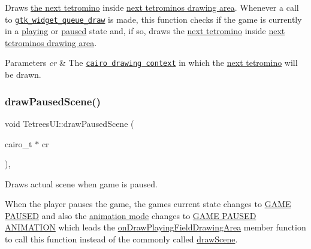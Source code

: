 Draws \hyperlink{classTetreesUI_a6296ce8f3cde853cec110718c4b88540}{the next tetromino} inside \hyperlink{TetreesUI_8cpp_aac997784ac88b494498d6e08d6fe62d5}{next tetromino\textquotesingle{}s drawing area}. Whenever a call to \href{https://developer.gnome.org/gtk3/stable/GtkWidget.html#gtk-widget-queue-draw}{\tt gtk\+\_\+widget\+\_\+queue\+\_\+draw} is made, this function checks if the game is currently in a \hyperlink{TetreesDefs_8hpp_aebae08b2e3a36f1452b33acaf1eaab40ab8ee64fcce8c3b17312b20c78fc9695a}{playing} or \hyperlink{TetreesDefs_8hpp_aebae08b2e3a36f1452b33acaf1eaab40ae6a757f0eb2e39168756440ac804ffa7}{paused} state and, if so, draws the \hyperlink{classTetreesUI_a6296ce8f3cde853cec110718c4b88540}{next tetromino} inside \hyperlink{TetreesUI_8cpp_aac997784ac88b494498d6e08d6fe62d5}{next tetromino\textquotesingle{}s drawing area}. 
\begin{DoxyParams}{Parameters}
{\em cr} & The \href{https://www.cairographics.org/manual/cairo-cairo-t.html}{\tt cairo drawing context} in which the \hyperlink{classTetreesUI_a6296ce8f3cde853cec110718c4b88540}{next tetromino} will be drawn. \\
\hline
\end{DoxyParams}
\mbox{\label{classTetreesUI_a7d39f8caa75f5e755e3cebb0e05bb779}} 
\subsubsection{\texorpdfstring{draw\+Paused\+Scene()}{drawPausedScene()}}
{\footnotesize\ttfamily void Tetrees\+U\+I\+::draw\+Paused\+Scene (\begin{DoxyParamCaption}\item[{cairo\+\_\+t $\ast$}]{cr }\end{DoxyParamCaption})\hspace{0.3cm}{\ttfamily [static]}, {\ttfamily [private]}}



Draws actual scene when game is paused. 

When the player pauses the game, the game\textquotesingle{}s current state changes to \hyperlink{TetreesDefs_8hpp_aebae08b2e3a36f1452b33acaf1eaab40ae6a757f0eb2e39168756440ac804ffa7}{G\+A\+ME P\+A\+U\+S\+ED} and also the \hyperlink{classTetreesUI_af3bd9b55da30d2b324c2dfe2d740d8a2}{animation mode} changes to \hyperlink{TetreesDefs_8hpp_a10487f3bfa31fd7b7b8c20f403f8c947abd2f3ba6deac9f6ca85c0c6247ab445c}{G\+A\+ME P\+A\+U\+S\+ED A\+N\+I\+M\+A\+T\+I\+ON} which leads the \hyperlink{classTetreesUI_a829fc73fdc1f45fb567168f2c37ab012}{on\+Draw\+Playing\+Field\+Drawing\+Area} member function to call this function instead of the commonly called \hyperlink{classTetreesUI_a357ae7240cc5f35b5d61244e7a6bcfe3}{draw\+Scene}.

